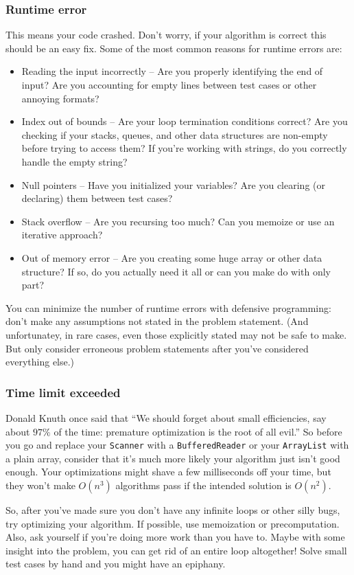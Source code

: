 \documentclass[a4paper,12pt]{article}
\begin{document}
\subsubsection{Runtime error}
This means your code crashed. Don't worry, if your algorithm is correct this should be an easy fix. Some of the most common reasons for runtime errors are:
\begin{itemize}
\item Reading the input incorrectly -- Are you properly identifying the end of input? Are you accounting for empty lines between test cases or other annoying formats?
\item Index out of bounds -- Are your loop termination conditions correct? Are you checking if your stacks, queues, and other data structures are non-empty before trying to access them? If you're working with strings, do you correctly handle the empty string?
\item Null pointers -- Have you initialized your variables? Are you clearing (or declaring) them between test cases?
\item Stack overflow -- Are you recursing too much? Can you memoize or use an iterative approach?
\item Out of memory error -- Are you creating some huge array or other data structure? If so, do you actually need it all or can you make do with only part?
\end{itemize}

You can minimize the number of runtime errors with defensive programming: don't make any assumptions not stated in the problem statement. (And unfortunatey, in rare cases, even those explicitly stated may not be safe to make. But only consider erroneous problem statements after you've considered everything else.)

\subsubsection{Time limit exceeded}
Donald Knuth once said that ``We should forget about small efficiencies, say about $97\%$ of the time: premature optimization is the root of all evil.'' So before you go and replace your \verb/Scanner/ with a \verb/BufferedReader/ or your \verb/ArrayList/ with a plain array, consider that it's much more likely your algorithm just isn't good enough. Your optimizations might shave a few milliseconds off your time, but they won't make $O(n^3)$ algorithms pass if the intended solution is $O(n^2)$.

So, after you've made sure you don't have any infinite loops or other silly bugs, try optimizing your algorithm. If possible, use memoization or precomputation. Also, ask yourself if you're doing more work than you have to. Maybe with some insight into the problem, you can get rid of an entire loop altogether! Solve small test cases by hand and you might have an epiphany.
\end{document}
